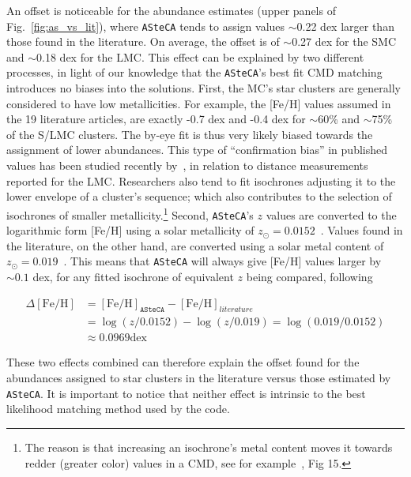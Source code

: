 \documentclass[draft]{aa}
\begin{document}
An offset is noticeable for the abundance estimates (upper panels of
Fig.~\ref{fig:as_vs_lit}), where \texttt{ASteCA} tends to assign values
$\sim$0.22 dex larger than those found in the literature.
On average, the offset is of $\sim$0.27 dex for the SMC and $\sim$0.18 dex for
the LMC.\@
%
This effect can be explained by two different processes, in light of our
knowledge that the \texttt{ASteCA}'s best fit CMD matching introduces no
biases into the solutions.
%
First, the MC's star clusters are generally considered to have low
metallicities. For example, the [Fe/H] values assumed in the 19
literature articles, are exactly -0.7 dex and -0.4 dex for $\sim$60\% and
$\sim$75\% of the S/LMC clusters. The by-eye fit is thus very likely biased
towards the assignment of lower abundances. This type of ``confirmation
bias'' in published values has been studied recently by~\cite{de_Grijs_2014}, in
relation to distance measurements reported for the LMC.\@
Researchers also tend to fit isochrones adjusting it to the lower envelope of a
cluster's sequence; which also contributes to the selection of isochrones of
smaller metallicity.\footnote{The reason is that increasing an isochrone's metal
content moves it towards redder (greater color) values in a CMD, see for
example~\cite{Bressan_2012}, Fig 15.}
%
Second, \texttt{ASteCA}'s $z$ values are converted to the logarithmic form 
[Fe/H]
using a solar metallicity of $z_{\odot}{=}0.0152$~\citep{Bressan_2012}.
Values found in the literature, on the other hand, are converted using a solar
metal content of $z_{\odot}{=}0.019$~\citep{Marigo_2008}. This means that
\texttt{ASteCA} will always give [Fe/H] values larger by ${\sim}0.1$ dex, for
any fitted isochrone of equivalent $z$ being compared, following

\begin{equation}
\begin{split}
\Delta\mathrm{[Fe/H]} & = \mathrm{[Fe/H]}_{\mathtt{ASteCA}} -
\mathrm{[Fe/H]}_{literature} \\
& = \log(z/0.0152) - \log(z/0.019) = \log(0.019/0.0152) \\
& \approx 0.0969 \mathrm{dex}
\end{split}
\label{eq:delta_feh}
\end{equation}

\noindent These two effects combined can therefore explain the offset found
for the abundances assigned to star clusters in the literature versus those
estimated by \texttt{ASteCA}. It is important to notice that neither effect is
intrinsic to the best likelihood matching method used by the code.
\end{document}
